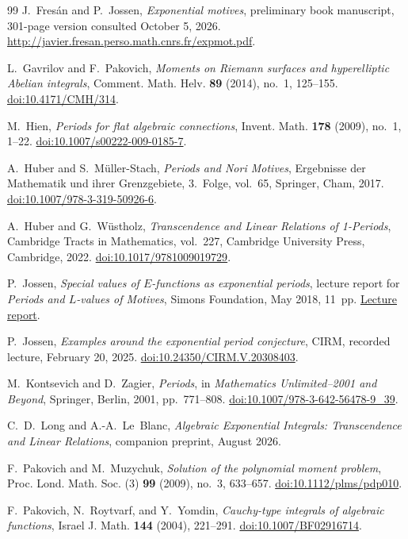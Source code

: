 \documentclass[11pt]{article}
\numberwithin{equation}{section}
\theoremstyle{definition}
\theoremstyle{remark}
\begin{document}
\begin{thebibliography}{99}
J.~Fres\'an and P.~Jossen,
\emph{Exponential motives},
preliminary book manuscript, 301-page version consulted October 5, 2026.
\url{http://javier.fresan.perso.math.cnrs.fr/expmot.pdf}.

L.~Gavrilov and F.~Pakovich,
\emph{Moments on Riemann surfaces and hyperelliptic Abelian integrals},
Comment. Math. Helv. \textbf{89} (2014), no.~1, 125--155.
\href{https://doi.org/10.4171/CMH/314}{doi:10.4171/CMH/314}.

M.~Hien,
\emph{Periods for flat algebraic connections},
Invent. Math. \textbf{178} (2009), no.~1, 1--22.
\href{https://doi.org/10.1007/s00222-009-0185-7}{doi:10.1007/\allowbreak s00222-009-0185-7}.

A.~Huber and S.~M\"uller-Stach,
\emph{Periods and Nori Motives},
Ergebnisse der Mathematik und ihrer Grenzgebiete, 3.~Folge, vol.~65,
Springer, Cham, 2017.
\href{https://doi.org/10.1007/978-3-319-50926-6}{doi:10.1007/978-3-319-50926-6}.

A.~Huber and G.~W\"ustholz,
\emph{Transcendence and Linear Relations of 1-Periods},
Cambridge Tracts in Mathematics, vol.~227,
Cambridge University Press, Cambridge, 2022.
\href{https://doi.org/10.1017/9781009019729}{doi:10.1017/9781009019729}.

P.~Jossen,
\emph{Special values of $E$-functions as exponential periods},
lecture report for \emph{Periods and $L$-values of Motives},
Simons Foundation, May 2018, 11~pp.
\href{https://simonsfoundation.s3.amazonaws.com/share/mps/symposia/2018/pdf/palvom/Report_Jossen.pdf}{Lecture report}.

P.~Jossen,
\emph{Examples around the exponential period conjecture},
CIRM, recorded lecture, February 20, 2025.
\href{https://doi.org/10.24350/CIRM.V.20308403}{doi:10.24350/CIRM.V.20308403}.

M.~Kontsevich and D.~Zagier,
\emph{Periods},
in \emph{Mathematics Unlimited--2001 and Beyond},
Springer, Berlin, 2001, pp.~771--808.
\href{https://doi.org/10.1007/978-3-642-56478-9_39}{doi:10.1007/978-3-642-56478-9\_39}.

C.~D.~Long and A.-A.~Le~Blanc,
\emph{Algebraic Exponential Integrals: Transcendence and Linear Relations},
companion preprint, August 2026.

F.~Pakovich and M.~Muzychuk,
\emph{Solution of the polynomial moment problem},
Proc. Lond. Math. Soc. (3) \textbf{99} (2009), no.~3, 633--657.
\href{https://doi.org/10.1112/plms/pdp010}{doi:10.1112/plms/pdp010}.

F.~Pakovich, N.~Roytvarf, and Y.~Yomdin,
\emph{Cauchy-type integrals of algebraic functions},
Israel J. Math. \textbf{144} (2004), 221--291.
\href{https://doi.org/10.1007/BF02916714}{doi:10.1007/BF02916714}.

\end{thebibliography}
\end{document}
